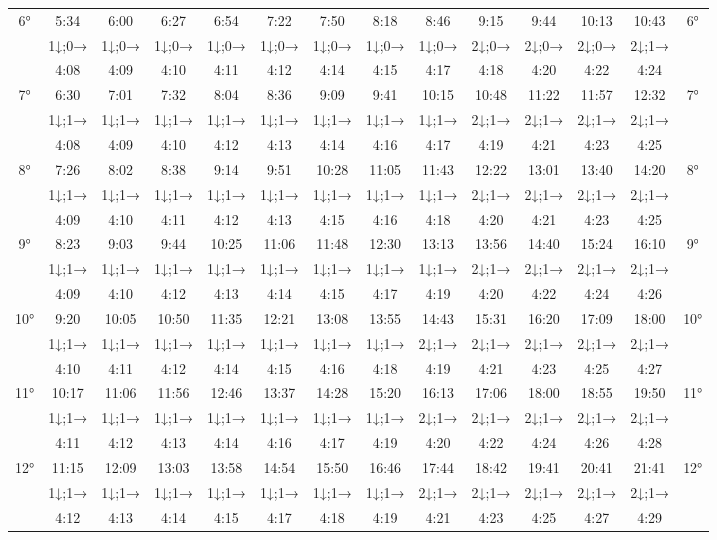 \begin{scriptsize}
\begin{tabular}{c || c | c | c | c | c | c | c | c | c | c | c | c || c}
		\multirow{3}{*}{6°}&5:34&6:00&6:27&6:54&7:22&7:50&8:18&8:46&9:15&9:44&10:13&10:43&\multirow{3}{*}{6°}\\ \space&1↓;0→&1↓;0→&1↓;0→&1↓;0→&1↓;0→&1↓;0→&1↓;0→&1↓;0→&2↓;0→&2↓;0→&2↓;0→&2↓;1→&\space\\&4:08&4:09&4:10&4:11&4:12&4:14&4:15&4:17&4:18&4:20&4:22&4:24&\space\\\hline
		\multirow{3}{*}{7°}&6:30&7:01&7:32&8:04&8:36&9:09&9:41&10:15&10:48&11:22&11:57&12:32&\multirow{3}{*}{7°}\\ \space&1↓;1→&1↓;1→&1↓;1→&1↓;1→&1↓;1→&1↓;1→&1↓;1→&1↓;1→&2↓;1→&2↓;1→&2↓;1→&2↓;1→&\space\\&4:08&4:09&4:10&4:12&4:13&4:14&4:16&4:17&4:19&4:21&4:23&4:25&\space\\\hline
		\multirow{3}{*}{8°}&7:26&8:02&8:38&9:14&9:51&10:28&11:05&11:43&12:22&13:01&13:40&14:20&\multirow{3}{*}{8°}\\ \space&1↓;1→&1↓;1→&1↓;1→&1↓;1→&1↓;1→&1↓;1→&1↓;1→&1↓;1→&2↓;1→&2↓;1→&2↓;1→&2↓;1→&\space\\&4:09&4:10&4:11&4:12&4:13&4:15&4:16&4:18&4:20&4:21&4:23&4:25&\space\\\hline
		\multirow{3}{*}{9°}&8:23&9:03&9:44&10:25&11:06&11:48&12:30&13:13&13:56&14:40&15:24&16:10&\multirow{3}{*}{9°}\\ \space&1↓;1→&1↓;1→&1↓;1→&1↓;1→&1↓;1→&1↓;1→&1↓;1→&1↓;1→&2↓;1→&2↓;1→&2↓;1→&2↓;1→&\space\\&4:09&4:10&4:12&4:13&4:14&4:15&4:17&4:19&4:20&4:22&4:24&4:26&\space\\\hline
		\multirow{3}{*}{10°}&9:20&10:05&10:50&11:35&12:21&13:08&13:55&14:43&15:31&16:20&17:09&18:00&\multirow{3}{*}{10°}\\ \space&1↓;1→&1↓;1→&1↓;1→&1↓;1→&1↓;1→&1↓;1→&1↓;1→&2↓;1→&2↓;1→&2↓;1→&2↓;1→&2↓;1→&\space\\&4:10&4:11&4:12&4:14&4:15&4:16&4:18&4:19&4:21&4:23&4:25&4:27&\space\\\hline
		\multirow{3}{*}{11°}&10:17&11:06&11:56&12:46&13:37&14:28&15:20&16:13&17:06&18:00&18:55&19:50&\multirow{3}{*}{11°}\\ \space&1↓;1→&1↓;1→&1↓;1→&1↓;1→&1↓;1→&1↓;1→&1↓;1→&2↓;1→&2↓;1→&2↓;1→&2↓;1→&2↓;1→&\space\\&4:11&4:12&4:13&4:14&4:16&4:17&4:19&4:20&4:22&4:24&4:26&4:28&\space\\\hline
		\multirow{3}{*}{12°}&11:15&12:09&13:03&13:58&14:54&15:50&16:46&17:44&18:42&19:41&20:41&21:41&\multirow{3}{*}{12°}\\ \space&1↓;1→&1↓;1→&1↓;1→&1↓;1→&1↓;1→&1↓;1→&1↓;1→&2↓;1→&2↓;1→&2↓;1→&2↓;1→&2↓;1→&\space\\&4:12&4:13&4:14&4:15&4:17&4:18&4:19&4:21&4:23&4:25&4:27&4:29&\space\\\hline

\end{tabular}
\end{scriptsize}
